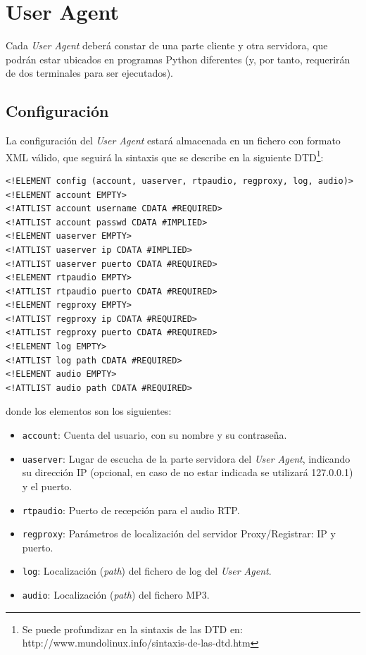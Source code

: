 \documentclass[a4paper,11pt]{article}
\begin{document}
\section{User Agent}

Cada \emph{User Agent} deberá constar de una parte cliente y otra servidora, que podrán estar ubicados en programas Python diferentes (y, por tanto, requerirán de dos terminales para ser ejecutados).

\subsection{Configuración}

La configuración del \emph{User Agent} estará almacenada en un fichero
con formato XML válido, que seguirá 
la sintaxis que se describe en la siguiente DTD\footnote{Se puede profundizar en la sintaxis de las DTD en: http://www.mundolinux.info/sintaxis-de-las-dtd.htm}:

\begin{verbatim}
<!ELEMENT config (account, uaserver, rtpaudio, regproxy, log, audio)>
<!ELEMENT account EMPTY>
<!ATTLIST account username CDATA #REQUIRED>
<!ATTLIST account passwd CDATA #IMPLIED>
<!ELEMENT uaserver EMPTY>
<!ATTLIST uaserver ip CDATA #IMPLIED>
<!ATTLIST uaserver puerto CDATA #REQUIRED>
<!ELEMENT rtpaudio EMPTY>
<!ATTLIST rtpaudio puerto CDATA #REQUIRED>
<!ELEMENT regproxy EMPTY>
<!ATTLIST regproxy ip CDATA #REQUIRED>
<!ATTLIST regproxy puerto CDATA #REQUIRED>
<!ELEMENT log EMPTY>
<!ATTLIST log path CDATA #REQUIRED>
<!ELEMENT audio EMPTY>
<!ATTLIST audio path CDATA #REQUIRED>
\end{verbatim}

donde los elementos son los siguientes:

\begin{itemize}
  \item \texttt{account}: Cuenta del usuario, con su nombre y su contraseña.
  \item \texttt{uaserver}: Lugar de escucha de la parte servidora del \emph{User Agent}, indicando su dirección IP (opcional, en caso de no estar indicada se utilizará 127.0.0.1) y el puerto.
  \item \texttt{rtpaudio}: Puerto de recepción para el audio RTP.
  \item \texttt{regproxy}: Parámetros de localización del servidor Proxy/Registrar: IP y puerto.
  \item \texttt{log}: Localización (\emph{path}) del fichero de log del \emph{User Agent}.
  \item \texttt{audio}: Localización (\emph{path}) del fichero MP3.
\end{itemize}
\end{document}

